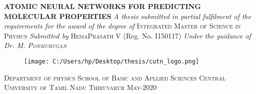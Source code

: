 \documentclass[11pt,a4paper]{report}
\begin{document}
	
	\begin{titlepage}
		\begin{center}
	\LARGE\textbf{ATOMIC
	NEURAL NETWORKS FOR \linebreak \linebreak
	PREDICTING MOLECULAR \linebreak \linebreak PROPERTIES}
	 \linebreak
	 \linebreak
\linebreak
\large \textit{A thesis submitted in partial fulfilment of the requirements \linebreak for the award of the degree of}
\linebreak
\linebreak
\LARGE \textsc{Integrated Master of Science in Physics}
\linebreak
\linebreak
	 \large \textit{Submitted by}
\linebreak
\linebreak
	 \LARGE \textsc{HemaPrasath V}
	 \linebreak
	 \linebreak
	 \large\upshape (Reg. No. I150117)
	 \linebreak
	 \linebreak
	 \large \itshape Under the guidance of
	 \linebreak
\linebreak
	 \large \upshape Dr. M. \textsc{Ponmurugan}
	\linebreak
	\linebreak
\upshape\large
\begin{figure} [H]
	\centering
	\texttt{[image: C:/Users/hp/Desktop/thesis/cutn\_logo.png]}
\end{figure}
\textsc{Department of physics \linebreak
School of Basic and Apllied Sciences\linebreak
Central University of Tamil Nadu\linebreak
Thiruvarur \linebreak
May-2020}
	\end{center}
	\end{titlepage}
	
\end{document}
